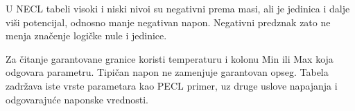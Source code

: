 U NECL tabeli visoki i niski nivoi su negativni prema masi, ali je jedinica i dalje viši potencijal, odnosno manje negativan napon. Negativni predznak zato ne menja značenje logičke nule i jedinice.

Za čitanje garantovane granice koristi temperaturu i kolonu Min ili Max koja odgovara parametru. Tipičan napon ne zamenjuje garantovan opseg. Tabela zadržava iste vrste parametara kao PECL primer, uz druge uslove napajanja i odgovarajuće naponske vrednosti.
